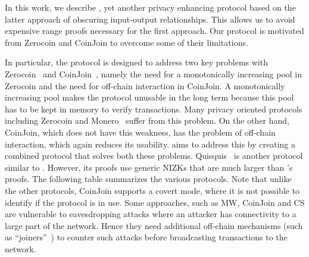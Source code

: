\documentclass[runningheads]{llncs}
\newcommand{\zerocoin}{Zerocoin\xspace}
\begin{document}
In this work, we describe \algname, yet another privacy enhancing protocol based on the latter approach of obscuring input-output relationships. This allows us to avoid expensive range proofs necessary for the first approach. Our protocol is motivated from \zerocoin and CoinJoin to overcome some of their limitations.

In particular, the protocol is designed to address two key problems with \zerocoin~\cite{zerocoin} and CoinJoin~\cite{coinjoin}, namely the need for a monotonically increasing pool in \zerocoin and the need for off-chain interaction in CoinJoin. A monotonically increasing pool makes the protocol unusable in the long term because this pool has to be kept in memory to verify transactions. Many privacy oriented protocols including \zerocoin and Monero~\cite{monero} suffer from this problem. On the other hand, CoinJoin, which does not have this weakness, has the problem of off-chain interaction, which again reduces its usability. \algname aims to address this by creating a combined protocol that solves both these problems. Quisquis~\cite{quisquis} is another protocol similar to \algname. However, its proofs use generic NIZKs that are much larger than \algname's proofs. The following table summarizes the various protocols. Note that unlike the other protocols, CoinJoin supports a covert mode, where it is not possible to identify if the protocol is in use. 
Some approaches, such as MW, CoinJoin and CS are vulnerable to eavesdropping attacks where an attacker has connectivity to a large part of the network. Hence they need
additional off-chain mechanisms (such as ``joiners''~\cite{composite}) to counter such attacks before broadcasting transactions to the network.  
\end{document}
